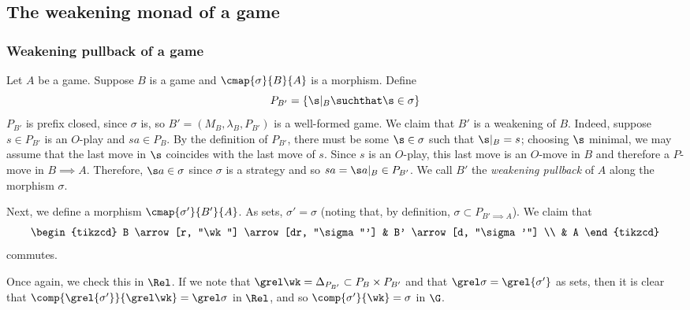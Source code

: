 \documentclass[11pt]{article} %
\begin{document}
\subsection{The weakening monad of a game}

\subsubsection{Weakening pullback of a game}

Let $A$ be a game.  Suppose $B$ is a game and $\cmap{\sigma}{B}{A}$ is a morphism.  Define
\[
  P_{B'}=\{\s\vert_B\suchthat \s\in\sigma\}
  \]
$P_{B'}$ is prefix closed, since $\sigma$ is, so $B'=(M_B, \lambda_B, P_{B'})$ is a well-formed game.  We claim that $B'$ is a weakening of $B$.  Indeed, suppose $s\in P_{B'}$ is an $O$-play and $sa\in P_B$.  By the definition of $P_{B'}$, there must be some $\s\in\sigma$ such that $\s\vert_B=s$; choosing $\s$ minimal, we may assume that the last move in $\s$ coincides with the last move of $s$.  Since $s$ is an $O$-play, this last move is an $O$-move in $B$ and therefore a $P$-move in $B\implies A$.  Therefore, $\s a\in \sigma$ since $\sigma$ is a strategy and so $sa=\s a\vert_B\in P_{B'}$.  We call $B'$ the \emph{weakening pullback} of $A$ along the morphism $\sigma$.

Next, we define a morphism $\cmap{\sigma'}{B'}{A}$.  As sets, $\sigma'=\sigma$ (noting that, by definition, $\sigma\subset P_{B'\implies A}$).  We claim that
\[
  \begin{tikzcd}
    B \arrow[r, "\wk"] \arrow[dr, "\sigma"']
      & B' \arrow[d, "\sigma'"] \\
      & A
  \end{tikzcd}
  \]
commutes.

Once again, we check this in $\Rel$.  If we note that $\grel\wk=\Delta_{P_{B'}}\subset P_B\times P_{B'}$ and that $\grel\sigma=\grel{\sigma'}$ as sets, then it is clear that $\comp{\grel{\sigma'}}{\grel\wk}=\grel\sigma$ in $\Rel$, and so $\comp{\sigma'}{\wk}=\sigma$ in $\G$.
\end{document}
